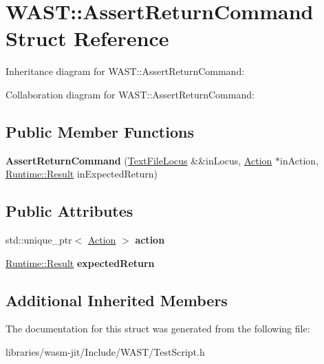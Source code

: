 \hypertarget{struct_w_a_s_t_1_1_assert_return_command}{}\section{W\+A\+ST\+:\+:Assert\+Return\+Command Struct Reference}
\label{struct_w_a_s_t_1_1_assert_return_command}


Inheritance diagram for W\+A\+ST\+:\+:Assert\+Return\+Command\+:


Collaboration diagram for W\+A\+ST\+:\+:Assert\+Return\+Command\+:
\subsection*{Public Member Functions}
\begin{DoxyCompactItemize}
\item 
\mbox{\label{struct_w_a_s_t_1_1_assert_return_command_a5b7e4ac72cc500905b19728f5b2d8c2e}} 
{\bfseries Assert\+Return\+Command} (\mbox{\hyperlink{struct_w_a_s_t_1_1_text_file_locus}{Text\+File\+Locus}} \&\&in\+Locus, \mbox{\hyperlink{struct_w_a_s_t_1_1_action}{Action}} $\ast$in\+Action, \mbox{\hyperlink{struct_runtime_1_1_result}{Runtime\+::\+Result}} in\+Expected\+Return)
\end{DoxyCompactItemize}
\subsection*{Public Attributes}
\begin{DoxyCompactItemize}
\item 
\mbox{\label{struct_w_a_s_t_1_1_assert_return_command_a5fd89c2b933f6d914fc7c441090f11a2}} 
std\+::unique\+\_\+ptr$<$ \mbox{\hyperlink{struct_w_a_s_t_1_1_action}{Action}} $>$ {\bfseries action}
\item 
\mbox{\label{struct_w_a_s_t_1_1_assert_return_command_a63d65dc4374ad6969642f3b1ec96eb9a}} 
\mbox{\hyperlink{struct_runtime_1_1_result}{Runtime\+::\+Result}} {\bfseries expected\+Return}
\end{DoxyCompactItemize}
\subsection*{Additional Inherited Members}


The documentation for this struct was generated from the following file\+:\begin{DoxyCompactItemize}
\item 
libraries/wasm-\/jit/\+Include/\+W\+A\+S\+T/Test\+Script.\+h\end{DoxyCompactItemize}
